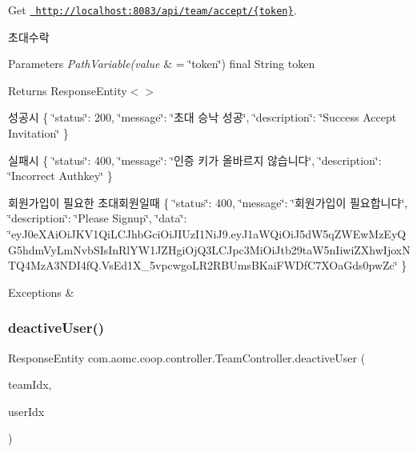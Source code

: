 Get \href{http://localhost:8083/api/team/accept/{token}}{\texttt{ http\+://localhost\+:8083/api/team/accept/\{token\}}}. 

초대수락


\begin{DoxyParams}{Parameters}
{\em Path\+Variable(value} & = \char`\"{}token\char`\"{}) final String token\\
\hline
\end{DoxyParams}
\begin{DoxyReturn}{Returns}
Response\+Entity$<$$>$
\end{DoxyReturn}
성공시 \{ \char`\"{}status\char`\"{}\+: 200, \char`\"{}message\char`\"{}\+: \char`\"{}초대 승낙 성공\char`\"{}, \char`\"{}description\char`\"{}\+: \char`\"{}\+Success Accept Invitation\char`\"{} \}

실패시 \{ \char`\"{}status\char`\"{}\+: 400, \char`\"{}message\char`\"{}\+: \char`\"{}인증 키가 올바르지 않습니다\char`\"{}, \char`\"{}description\char`\"{}\+: \char`\"{}\+Incorrect Authkey\char`\"{} \}

회원가입이 필요한 초대회원일때 \{ \char`\"{}status\char`\"{}\+: 400, \char`\"{}message\char`\"{}\+: \char`\"{}회원가입이 필요합니다\char`\"{}, \char`\"{}description\char`\"{}\+: \char`\"{}\+Please Signup\char`\"{}, \char`\"{}data\char`\"{}\+: \char`\"{}ey\+J0e\+X\+Ai\+Oi\+J\+K\+V1\+Qi\+L\+C\+Jhb\+Gci\+Oi\+J\+I\+Uz\+I1\+Ni\+J9.\+ey\+J1a\+W\+Qi\+Oi\+J5d\+W5q\+Z\+W\+Ew\+Mz\+Ey\+Q\+G5hdm\+Vy\+Lm\+Nvb\+S\+Is\+In\+Rl\+Y\+W1\+J\+Z\+Hgi\+Oj\+Q3\+L\+C\+Jpc3\+Mi\+Oi\+Jtb29ta\+W5n\+Iiwi\+Z\+Xhw\+Ijox\+N\+T\+Q4\+Mz\+A3\+N\+D\+I4f\+Q.\+Vs\+Ed1\+X\+\_\+5vpcwgo\+L\+R2\+R\+B\+Ums\+B\+Kai\+F\+W\+Df\+C7\+X\+Oa\+Gds0pw\+Zc\char`\"{} \}


\begin{DoxyExceptions}{Exceptions}
{\em } & \\
\hline
\end{DoxyExceptions}
\mbox{\label{classcom_1_1aomc_1_1coop_1_1controller_1_1_team_controller_a0458b6213d34ba925524eaf1471961fd}} 
\subsubsection{\texorpdfstring{deactiveUser()}{deactiveUser()}}
{\footnotesize\ttfamily Response\+Entity com.\+aomc.\+coop.\+controller.\+Team\+Controller.\+deactive\+User (\begin{DoxyParamCaption}\item[{@Path\+Variable(value=\char`\"{}team\+Idx\char`\"{}) final int}]{team\+Idx,  }\item[{@Path\+Variable(value=\char`\"{}user\+Idx\char`\"{}) final int}]{user\+Idx }\end{DoxyParamCaption})}




